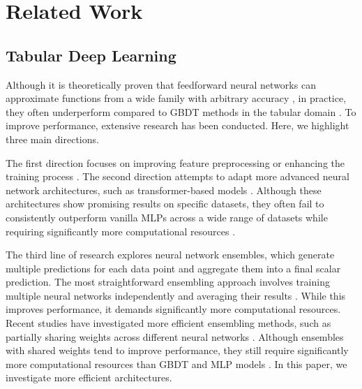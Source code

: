\section{Related Work}
\label{related}

\subsection{Tabular Deep Learning}
Although it is theoretically proven that feedforward neural networks can approximate functions from a wide family with arbitrary accuracy \cite{cybenko1989approximation,hornik1991approximation}, in practice, they often underperform compared to GBDT methods in the tabular domain \cite{gorishniy2021revisiting,shwartz2022tabular,grinsztajn2022tree}. To improve performance, extensive research has been conducted. Here, we highlight three main directions.

The first direction focuses on improving feature preprocessing \cite{gorishniy2022embeddings,guo2021embedding} or enhancing the training process \cite{bahri2021scarf,gorishniy2021revisiting,jeffares2023tangos,holzmuller2024better,kadra2021well}. The second direction attempts to adapt more advanced neural network architectures, such as transformer-based models \cite{huang2020tabtransformer,somepalli2021saint,song2019autoint}. Although these architectures show promising results on specific datasets, they often fail to consistently outperform vanilla MLPs across a wide range of datasets while requiring significantly more computational resources \cite{gorishniy2024tabm}. 

The third line of research explores neural network ensembles, which generate multiple predictions for each data point and aggregate them into a final scalar prediction. The most straightforward ensembling approach involves training multiple neural networks independently and averaging their results \cite{lakshminarayanan2017simple}. While this improves performance, it demands significantly more computational resources. Recent studies have investigated more efficient ensembling methods, such as partially sharing weights across different neural networks \cite{gorishniy2024tabm,wen2020batchensemble}. Although ensembles with shared weights tend to improve performance, they still require significantly more computational resources than GBDT and MLP models \cite{gorishniy2024tabm}. In this paper, we investigate more efficient architectures.

